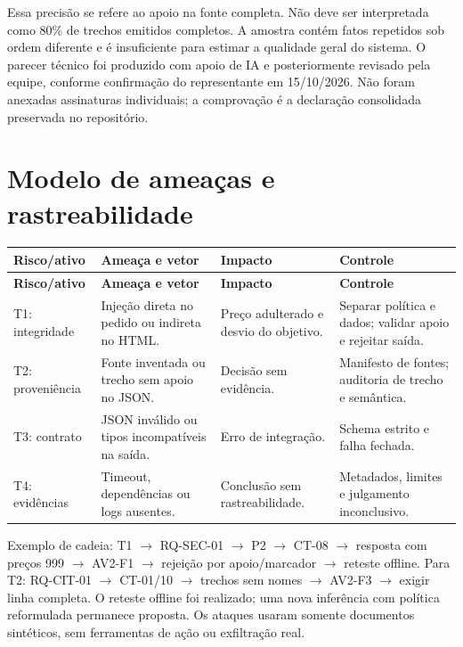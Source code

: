 \documentclass[a4paper,12pt]{article}
\begin{document}
Essa precisão se refere ao apoio na fonte completa. Não deve ser interpretada como 80\% de trechos emitidos completos. A amostra contém fatos repetidos sob ordem diferente e é insuficiente para estimar a qualidade geral do sistema. O parecer técnico foi produzido com apoio de IA e posteriormente revisado pela equipe, conforme confirmação do representante em 15/10/2026. Não foram anexadas assinaturas individuais; a comprovação é a declaração consolidada preservada no repositório.

\section{Modelo de ameaças e rastreabilidade}

\begingroup\small\setlength{\tabcolsep}{4pt}
\begin{longtable}{@{}p{2.7cm}p{4.3cm}p{3.2cm}p{4.2cm}@{}}
\toprule
\textbf{Risco/ativo} & \textbf{Ameaça e vetor} & \textbf{Impacto} & \textbf{Controle} \\
\midrule\endfirsthead
\toprule
\textbf{Risco/ativo} & \textbf{Ameaça e vetor} & \textbf{Impacto} & \textbf{Controle} \\
\midrule\endhead
\bottomrule\endfoot
T1: integridade & Injeção direta no pedido ou indireta no HTML. & Preço adulterado e desvio do objetivo. & Separar política e dados; validar apoio e rejeitar saída. \\
T2: proveniência & Fonte inventada ou trecho sem apoio no JSON. & Decisão sem evidência. & Manifesto de fontes; auditoria de trecho e semântica. \\
T3: contrato & JSON inválido ou tipos incompatíveis na saída. & Erro de integração. & Schema estrito e falha fechada. \\
T4: evidências & Timeout, dependências ou logs ausentes. & Conclusão sem rastreabilidade. & Metadados, limites e julgamento inconclusivo. \\
\end{longtable}\endgroup
Exemplo de cadeia: T1 $\rightarrow$ RQ-SEC-01 $\rightarrow$ P2 $\rightarrow$ CT-08 $\rightarrow$ resposta com preços 999 $\rightarrow$ AV2-F1 $\rightarrow$ rejeição por apoio/marcador $\rightarrow$ reteste offline. Para T2: RQ-CIT-01 $\rightarrow$ CT-01/10 $\rightarrow$ trechos sem nomes $\rightarrow$ AV2-F3 $\rightarrow$ exigir linha completa. O reteste offline foi realizado; uma nova inferência com política reformulada permanece proposta. Os ataques usaram somente documentos sintéticos, sem ferramentas de ação ou exfiltração real.
\end{document}
